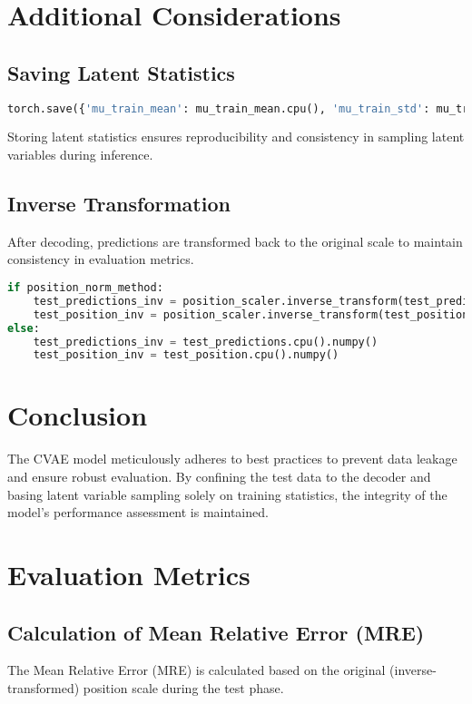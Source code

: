 \documentclass[10pt]{article}
\begin{document}
\section{Additional Considerations}

\subsection{Saving Latent Statistics}
\begin{lstlisting}[language=Python, caption=Saving Latent Statistics]
torch.save({'mu_train_mean': mu_train_mean.cpu(), 'mu_train_std': mu_train_std.cpu()}, 'latent_stats.pt')
\end{lstlisting}

Storing latent statistics ensures reproducibility and consistency in sampling latent variables during inference.

\subsection{Inverse Transformation}
After decoding, predictions are transformed back to the original scale to maintain consistency in evaluation metrics.

\begin{lstlisting}[language=Python, caption=Inverse Transformation]
if position_norm_method:
    test_predictions_inv = position_scaler.inverse_transform(test_predictions.cpu().numpy())
    test_position_inv = position_scaler.inverse_transform(test_position.cpu().numpy())
else:
    test_predictions_inv = test_predictions.cpu().numpy()
    test_position_inv = test_position.cpu().numpy()
\end{lstlisting}

\section{Conclusion}
The CVAE model meticulously adheres to best practices to prevent data leakage and ensure robust evaluation. By confining the test data to the decoder and basing latent variable sampling solely on training statistics, the integrity of the model’s performance assessment is maintained.

\section{Evaluation Metrics}

\subsection{Calculation of Mean Relative Error (MRE)}
The Mean Relative Error (MRE) is calculated based on the original (inverse-transformed) position scale during the test phase.
\end{document}

